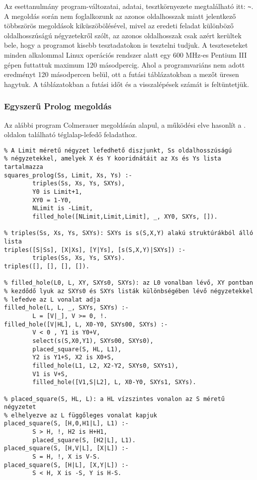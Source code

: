 Az esettanulmány program-változatai, adatai, tesztkörnyezete
megtalálható itt: \verb'~'.
\br
A megoldás során nem foglalkozunk az azonos oldalhosszak miatt jelentkező többszörös
megoldások kiküszöbölésével, mivel az eredeti feladat különböző oldalhosszúságú négyzetekről
szólt, az azonos oldalhosszak csak azért kerültek bele, hogy a programot kisebb
tesztadatokon is tesztelni tudjuk. A teszteseteket minden alkalommal Linux operációs
rendszer alatt egy 600 MHz-es Pentium III gépen futtattuk maximum 120 másodpercig. Ahol
a programvariáns nem adott eredményt 120 másodpercen belül, ott a futási táblázatokban
a mezőt üresen hagytuk. A táblázatokban a futási időt és a visszalépések számát
is feltüntetjük.

\subsubsection{Egyszerű Prolog megoldás}

Az alábbi program Colmerauer \clpr megoldásán alapul, a működési elve hasonlít a
\pageref{teglalap:clpqr}. oldalon található téglalap-lefedő feladathoz.

\begin{verbatim}
% A Limit méretű négyzet lefedhető diszjunkt, Ss oldalhosszúságú
% négyzetekkel, amelyek X és Y kooridnátáit az Xs és Ys lista tartalmazza
squares_prolog(Ss, Limit, Xs, Ys) :-
        triples(Ss, Xs, Ys, SXYs),
        Y0 is Limit+1, 
        XY0 = 1-Y0, 
        NLimit is -Limit,
        filled_hole([NLimit,Limit,Limit], _, XY0, SXYs, []).

% triples(Ss, Xs, Ys, SXYs): SXYs is s(S,X,Y) alakú struktúrákból álló lista
triples([S|Ss], [X|Xs], [Y|Ys], [s(S,X,Y)|SXYs]) :-
        triples(Ss, Xs, Ys, SXYs).
triples([], [], [], []).

% filled_hole(L0, L, XY, SXYs0, SXYs): az L0 vonalban lévő, XY pontban
% kezdődő lyuk az SXYs0 és SXYs listák különbségében lévő négyzetekkel
% lefedve az L vonalat adja
filled_hole(L, L, _, SXYs, SXYs) :-
        L = [V|_], V >= 0, !.
filled_hole([V|HL], L, X0-Y0, SXYs00, SXYs) :-
        V < 0 , Y1 is Y0+V,  
        select(s(S,X0,Y1), SXYs00, SXYs0),
        placed_square(S, HL, L1),  
        Y2 is Y1+S, X2 is X0+S,
        filled_hole(L1, L2, X2-Y2, SXYs0, SXYs1),  
        V1 is V+S,
        filled_hole([V1,S|L2], L, X0-Y0, SXYs1, SXYs).

% placed_square(S, HL, L): a HL vízszintes vonalon az S méretű négyzetet
% elhelyezve az L függőleges vonalat kapjuk
placed_square(S, [H,0,H1|L], L1) :- 
        S > H, !, H2 is H+H1,
        placed_square(S, [H2|L], L1).
placed_square(S, [H,V|L], [X|L]) :- 
        S = H, !, X is V-S.
placed_square(S, [H|L], [X,Y|L]) :- 
        S < H, X is -S, Y is H-S.
\end{verbatim}

